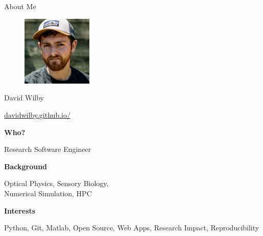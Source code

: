 \documentclass{beamer} %
\begin{document}
  \begin{frame}{About Me}

    \begin{figure}
        \includegraphics[width=0.3\textwidth]{wilby}
    \end{figure}

    David Wilby

    \href{https://davidwilby.github.io/}{davidwilby.github.io/}

    \textbf{Who?}
    
    Research Software Engineer

    \textbf{Background}

    Optical Physics, Sensory Biology, \\Numerical Simulation, HPC

    \textbf{Interests}

    Python, Git, Matlab, Open Source, Web Apps, Research Impact, Reproducibility

  \end{frame}
\end{document}
